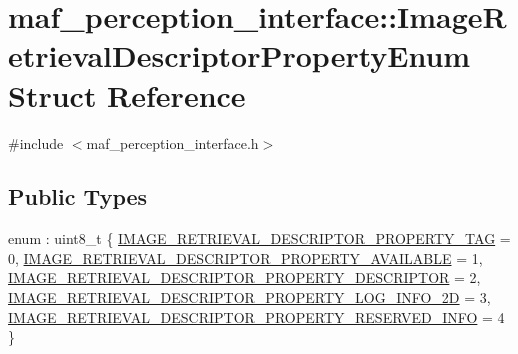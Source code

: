 \hypertarget{structmaf__perception__interface_1_1ImageRetrievalDescriptorPropertyEnum}{}\section{maf\+\_\+perception\+\_\+interface\+:\+:Image\+Retrieval\+Descriptor\+Property\+Enum Struct Reference}
\label{structmaf__perception__interface_1_1ImageRetrievalDescriptorPropertyEnum}


{\ttfamily \#include $<$maf\+\_\+perception\+\_\+interface.\+h$>$}

\subsection*{Public Types}
\begin{DoxyCompactItemize}
\item 
enum \+: uint8\+\_\+t \{ \newline
\hyperlink{structmaf__perception__interface_1_1ImageRetrievalDescriptorPropertyEnum_abd10dca2cfb27ce18ee6bd3910bba303a5d19cce9e8d4340121f6362345a24547}{I\+M\+A\+G\+E\+\_\+\+R\+E\+T\+R\+I\+E\+V\+A\+L\+\_\+\+D\+E\+S\+C\+R\+I\+P\+T\+O\+R\+\_\+\+P\+R\+O\+P\+E\+R\+T\+Y\+\_\+\+T\+AG} = 0, 
\hyperlink{structmaf__perception__interface_1_1ImageRetrievalDescriptorPropertyEnum_abd10dca2cfb27ce18ee6bd3910bba303a2e7734b5956a3b6bb96f4521cac0296c}{I\+M\+A\+G\+E\+\_\+\+R\+E\+T\+R\+I\+E\+V\+A\+L\+\_\+\+D\+E\+S\+C\+R\+I\+P\+T\+O\+R\+\_\+\+P\+R\+O\+P\+E\+R\+T\+Y\+\_\+\+A\+V\+A\+I\+L\+A\+B\+LE} = 1, 
\hyperlink{structmaf__perception__interface_1_1ImageRetrievalDescriptorPropertyEnum_abd10dca2cfb27ce18ee6bd3910bba303a07c39ea660ae025313747fff69aa9d57}{I\+M\+A\+G\+E\+\_\+\+R\+E\+T\+R\+I\+E\+V\+A\+L\+\_\+\+D\+E\+S\+C\+R\+I\+P\+T\+O\+R\+\_\+\+P\+R\+O\+P\+E\+R\+T\+Y\+\_\+\+D\+E\+S\+C\+R\+I\+P\+T\+OR} = 2, 
\hyperlink{structmaf__perception__interface_1_1ImageRetrievalDescriptorPropertyEnum_abd10dca2cfb27ce18ee6bd3910bba303a569e0822642c3b9f86bd64cf4cc4febf}{I\+M\+A\+G\+E\+\_\+\+R\+E\+T\+R\+I\+E\+V\+A\+L\+\_\+\+D\+E\+S\+C\+R\+I\+P\+T\+O\+R\+\_\+\+P\+R\+O\+P\+E\+R\+T\+Y\+\_\+\+L\+O\+G\+\_\+\+I\+N\+F\+O\+\_\+2D} = 3, 
\newline
\hyperlink{structmaf__perception__interface_1_1ImageRetrievalDescriptorPropertyEnum_abd10dca2cfb27ce18ee6bd3910bba303a75043ab42ba3d51dbc40731b2675b04c}{I\+M\+A\+G\+E\+\_\+\+R\+E\+T\+R\+I\+E\+V\+A\+L\+\_\+\+D\+E\+S\+C\+R\+I\+P\+T\+O\+R\+\_\+\+P\+R\+O\+P\+E\+R\+T\+Y\+\_\+\+R\+E\+S\+E\+R\+V\+E\+D\+\_\+\+I\+N\+FO} = 4
 \}
\end{DoxyCompactItemize}
